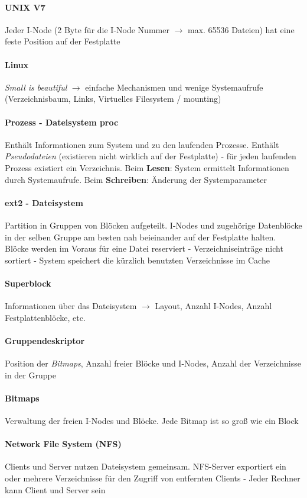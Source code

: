 \documentclass[10pt,a4paper,landscape]{article}
\begin{document}
\begin{multicols*}{3}
	\paragraph{UNIX V7} Jeder I-Node (2 Byte für die I-Node Nummer $\rightarrow$ max. 65536 Dateien) hat eine feste Position auf der Festplatte
	\paragraph{Linux} \textit{Small is beautiful} $\rightarrow$ einfache Mechanismen und wenige Systemaufrufe (Verzeichnisbaum, Links, Virtuelles Filesystem / mounting)
	\paragraph{Prozess - Dateisystem proc} Enthält Informationen zum System und zu den laufenden Prozesse. Enthält \textit{Pseudodateien} (existieren nicht wirklich auf der Festplatte) - für jeden laufenden Prozess existiert ein Verzeichnis. Beim \textbf{Lesen}: System ermittelt Informationen durch Systemaufrufe. Beim \textbf{Schreiben}: Änderung der Systemparameter
	\paragraph{ext2 - Dateisystem} Partition in Gruppen von Blöcken aufgeteilt. I-Nodes und zugehörige Datenblöcke in der selben Gruppe am besten nah beieinander auf der Festplatte halten. Blöcke werden im Voraus für eine Datei reserviert - Verzeichniseinträge nicht sortiert - System speichert die kürzlich benutzten Verzeichnisse im Cache
	\paragraph{Superblock} Informationen über das Dateisystem $\rightarrow$ Layout, Anzahl I-Nodes, Anzahl Festplattenblöcke, etc.
	\paragraph{Gruppendeskriptor} Position der \textit{Bitmaps}, Anzahl freier Blöcke und I-Nodes, Anzahl der Verzeichnisse in der Gruppe
	\paragraph{Bitmaps} Verwaltung der freien I-Nodes und Blöcke. Jede Bitmap ist so groß wie ein Block
	\paragraph{Network File System (NFS)} Clients und Server nutzen Dateisystem gemeinsam. NFS-Server exportiert ein oder mehrere Verzeichnisse für den Zugriff von entfernten Clients - Jeder Rechner kann Client und Server sein

\end{multicols*}
\end{document}
